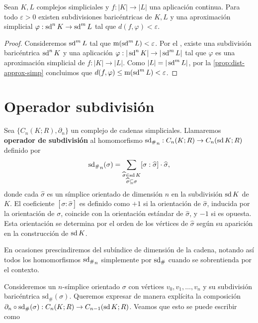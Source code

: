 \begin{corolario}
	Sean $K,L$ complejos simpliciales y $f: |K| \to |L|$ una aplicación continua. Para todo $\varepsilon > 0$ existen subdivisiones baricéntricas de $K, L$ y una aproximación simplicial $\varphi : \operatorname{sd}^n K \to \operatorname{sd}^m L$ tal que $d(f,\varphi) < \varepsilon$.
\end{corolario}
\begin{proof}
	Consideremos $\operatorname{sd}^m L$ tal que $\operatorname{m}(\operatorname{sd}^m L) < \varepsilon$. Por el , existe una subdivisión baricéntrica $\operatorname{sd}^n K$ y una aplicación $\varphi:|\operatorname{sd}^n K| \to |\operatorname{sd}^m L|$ tal que $\varphi$ es una aproximación simplicial de $f: |K| \to |L|$. Como $|L| = |\operatorname{sd}^m L|$, por la \autoref{prop:dist-approx-simp} concluimos que $d(f,\varphi) \leq \operatorname{m}(\operatorname{sd}^m L) < \varepsilon$.
\end{proof}

\section{Operador subdivisión}
\begin{definicion}
	\label{def:op_subdiv}
	Sea \(\{C_n(K; R), \partial_n\}\) un complejo de cadenas simpliciales. Llamaremos \textbf{operador de subdivisión} al homomorfismo \({\operatorname{sd}_\#}_n : C_n(K; R) \to C_n(\operatorname{sd} K; R)\) definido por
	\[
		{\operatorname{sd}_\#}_n(\sigma) = \sum_{\substack{{\widehat{\sigma} \in  \operatorname{sd} K} \\ {\widehat{\sigma} \subseteq \sigma}}} [\sigma : \widehat{\sigma}] \cdot \widehat{\sigma},
	\]
	donde cada \(\widehat{\sigma}\) es un símplice orientado de dimensión $n$ en la subdivisión \(\operatorname{sd} K\) de \(K\). El coeficiente \( [\sigma : \widehat{\sigma}] \) es definido como \(+1\) si la orientación de \(\widehat{\sigma}\), inducida por la orientación de \(\sigma\), coincide con la orientación estándar de \(\widehat{\sigma}\), y \(-1\) si es opuesta. Esta orientación se determina por el orden de los vértices de \(\widehat{\sigma}\) según su aparición en la construcción de \(\operatorname{sd} K\).
\end{definicion}
\begin{nota}
	En ocasiones prescindiremos del subíndice de dimensión de la cadena, notando así todos los homomorfismos ${\operatorname{sd}_\#}_n$ simplemente por $\operatorname{sd}_\#$ cuando se sobrentienda por el contexto.
\end{nota}

Consideremos un \( n \)-símplice orientado \( \sigma \) con vértices \( v_0, v_1, \ldots, v_n \) y su subdivisión baricéntrica \( \text{sd}_\#(\sigma) \). Queremos expresar de manera explícita la composición \( \partial_n \circ \text{sd}_\#(\sigma) : C_n(K;R) \to C_{n-1}(\operatorname{sd} K;R) \). Veamos que esto se puede escribir como

